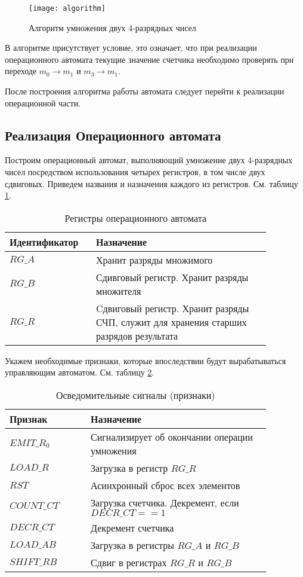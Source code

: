 \documentclass[a4paper,14pt]{extarticle}
\begin{document}
\begin{figure}[h!]
	\centering
	\texttt{[image: algorithm]}
	\caption {Алгоритм умножения двух 4-разрядных чисел}
	\label{img:algorithm2}
\end{figure}

В алгоритме присутствует условие, это означает, что при реализации операционного автомата текущие значение счетчика необходимо проверять при переходе $m_0 \to m_1$ и $m_3 \to m_1$.

После построения алгоритма работы автомата следует перейти к реализации операционной части.

\subsection {Реализация Операционного автомата}
Построим операционный автомат, выполняющий умножение двух 4-разрядных чисел посредством использования четырех регистров, в том числе двух сдвиговых. Приведем названия и назначения каждого из регистров. См. таблицу \ref{tab:regs2}.
\begin{table}[h!]
	\centering
	\begin{tabular}{|p{0.27\linewidth}|p{0.6\linewidth}|}
		\hline
		\textbf{Идентификатор} & \textbf{Назначение} \\ \hline
		$RG\_A$ & Хранит разряды множимого \\ \hline
		$RG\_B$ & Сдивговый регистр. Хранит разряды множителя \\ \hline
		$RG\_R$ & Cдвиговый регистр. Хранит разряды СЧП, служит для хранения старших разрядов результата \\ \hline
	\end{tabular}
	\caption{Регистры операционного автомата}
	\label{tab:regs2}
\end{table}

Укажем необходимые признаки, которые впоследствии будут вырабатываться управляющим автоматом. См. таблицу \ref{tab:signals2}.
\begin{table}[hbtp]
	\centering
	\begin{tabular}{|p{0.27\linewidth}|p{0.6\linewidth}|}
		\hline
		\textbf{Признак} & \textbf{Назначение} \\ \hline
		$EMIT\_R_0$ & Сигнализирует об окончании операции умножения \\ \hline
		$LOAD\_R$ & Загрузка в регистр $RG\_R$ \\ \hline
		$RST$ & Асинхронный сброс всех элементов \\ \hline
		$COUNT\_CT$ & Загрузка счетчика. Декремент, если $DECR\_CT==1$ \\ \hline
		$DECR\_CT$ & Декремент счетчика \\ \hline
		$LOAD\_AB$ & Загрузка в регистры $RG\_A \text{ и } RG\_B$ \\ \hline
		$SHIFT\_RB$ & Сдвиг в регистрах $RG\_R \text{ и } RG\_B$ \\ \hline
	\end{tabular}
	\caption{Осведомительные сигналы (признаки)}
	\label{tab:signals2}
\end{table}
\end{document}
